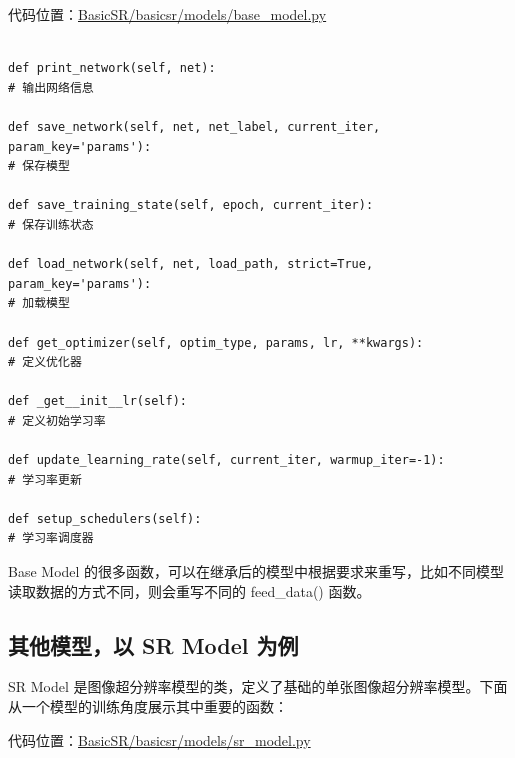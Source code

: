 \documentclass[../main.tex]{subfiles}
\begin{document}
代码位置：\href{https://github.com/XPixelGroup/BasicSR/blob/master/basicsr/models/base_model.py}{BasicSR/basicsr/models/base\_model.py}
\begin{verbatim}

def print_network(self, net):
# 输出网络信息

def save_network(self, net, net_label, current_iter, param_key='params'):
# 保存模型

def save_training_state(self, epoch, current_iter):
# 保存训练状态

def load_network(self, net, load_path, strict=True, param_key='params'):
# 加载模型

def get_optimizer(self, optim_type, params, lr, **kwargs):
# 定义优化器

def _get__init__lr(self):
# 定义初始学习率

def update_learning_rate(self, current_iter, warmup_iter=-1):
# 学习率更新

def setup_schedulers(self):
# 学习率调度器
\end{verbatim}

\begin{hl} %
Base Model 的很多函数，可以在继承后的模型中根据要求来重写，比如不同模型读取数据的方式不同，则会重写不同的 feed\_data() 函数。
\end{hl}

\subsection{其他模型，以 SR Model 为例}\label{Model:SR Model}

SR Model 是图像超分辨率模型的类，定义了基础的单张图像超分辨率模型。下面从一个模型的训练角度展示其中重要的函数：

代码位置：\href{https://github.com/XPixelGroup/BasicSR/blob/master/basicsr/models/sr_model.py}{BasicSR/basicsr/models/sr\_model.py}
\end{document}
